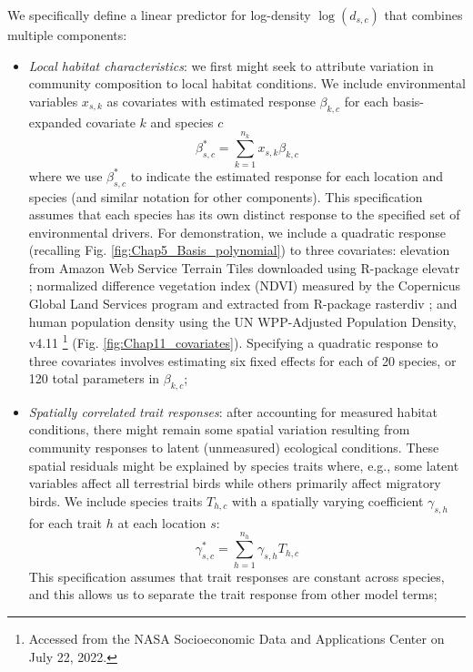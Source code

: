 We specifically define a linear predictor for log-density \(\log(d_{s,c})\) that combines multiple components:
\begin{itemize}
    \item \textit{Local habitat characteristics}: 
    we first might seek to attribute variation in community composition to local habitat conditions. 
    We include environmental variables \(x_{s,k}\) as covariates with estimated response \(\beta_{k,c}\) for each basis-expanded covariate \(k\) and species \(c\)
    \begin{equation} \label{eq:Chap11_covariate_response}
        \beta_{s,c}^* = \sum_{k=1}^{n_k} x_{s,k} \beta_{k,c}
    \end{equation}
    where we use \(\beta^*_{s,c}\) to indicate the estimated response for each location and species (and similar notation for other components). This specification assumes that each species has its own distinct response to the specified set of environmental drivers.  For demonstration, we include a quadratic response (recalling Fig. \ref{fig:Chap5_Basis_polynomial}) to three covariates:  elevation from Amazon Web Service Terrain Tiles downloaded using R-package \colorbox{backcolour}{elevatr} \cite{hollister_elevatr_2022}; normalized difference vegetation index (NDVI) measured by the Copernicus Global Land Services program and extracted from R-package \colorbox{backcolour}{rasterdiv} \cite{rocchini_rasterdiv_2021}; and human population density using the UN WPP-Adjusted Population Density, v4.11 \cite{center_for_international_earth_science_information_networkciesin_gridded_2016}\footnote{Accessed from the NASA Socioeconomic Data and Applications Center on July 22, 2022.} (Fig. \ref{fig:Chap11_covariates}).  Specifying a quadratic response to three covariates involves estimating six fixed effects for each of 20 species, or 120 total parameters in \(\beta_{k,c}\);  
    
    \item \textit{Spatially correlated trait responses}:  after accounting for measured habitat conditions, there might remain some spatial variation resulting from community responses to latent (unmeasured) ecological conditions.  These spatial residuals might be explained by species traits where, e.g., some latent variables affect all terrestrial birds while others primarily affect migratory birds.  We include species traits \(T_{h,c}\) with a spatially varying coefficient \(\gamma_{s,h}\) for each trait \(h\) at each location \(s\):
    \begin{equation} \label{eq:Chap11_trait_response}
        \gamma_{s,c}^* = \sum_{h=1}^{n_h} \gamma_{s,h} T_{h,c}
    \end{equation}
    This specification assumes that trait responses are constant across species, and this allows us to separate the trait response from other model terms;  
    

\end{itemize}
